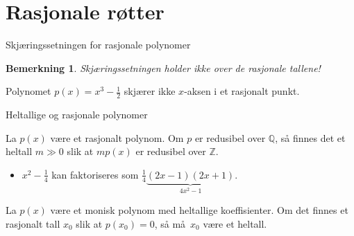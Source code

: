 \documentclass[norsk]{beamer}
\theoremstyle{example}
\newtheorem{remark}{Bemerkning}
\begin{document}
\section{Rasjonale røtter}

\begin{frame}{Skjæringssetningen for rasjonale polynomer}
    \begin{remark}
        Skjæringssetningen holder ikke over de rasjonale tallene!
    \end{remark}
    \begin{example}
        Polynomet $p(x) = x^3 - \frac 1 2$ skjærer ikke $x$-aksen i et rasjonalt punkt.
        \begin{figure}
            \centering
        \end{figure}
    \end{example}
\end{frame}

\begin{frame}{Heltallige og rasjonale polynomer}
    \begin{lemma}
        La $p(x)$ være et rasjonalt polynom.
        Om $p$ er redusibel over $\mathbb Q$,
        så finnes det et heltall $m \gg 0$ slik at
        $mp(x)$ er redusibel over $\mathbb Z$.
    \end{lemma}
    \begin{example}
        \begin{itemize}
            \item $x^2 - \frac 1 4$
                kan faktoriseres som $\frac 1 4 \underbrace{(2x - 1)(2x + 1)}_{4x^2 - 1}$.
        \end{itemize}
    \end{example}
    \pause
    \begin{theorem}
        La $p(x)$ være et monisk polynom med heltallige koeffisienter.
        Om det finnes et rasjonalt tall $x_0$ slik at
        $p(x_0) = 0$, så må $x_0$ være et heltall.
    \end{theorem}
\end{frame}
\end{document}
